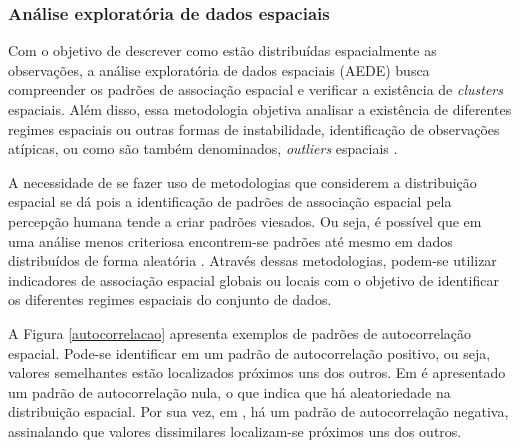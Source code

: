 \documentclass[
	12pt,				%
	openright,			%
	oneside,			%
	a4paper,			%
	chapter=TITLE,		%
	section=TITLE,		%
	english,			%
	french,				%
	spanish,			%
	brazil				%
	]{abntex2}
\begin{document}
 


\subsubsection{Análise exploratória de dados espaciais}


Com o objetivo de descrever como estão distribuídas espacialmente as observações, a análise exploratória de dados espaciais (AEDE) busca compreender os padrões de associação espacial e verificar a existência de \textit{clusters} espaciais. Além disso, essa metodologia  objetiva analisar a existência de diferentes regimes espaciais  ou outras formas de instabilidade, identificação de observações atípicas, ou como são também denominados, \textit{outliers} espaciais \cite{almeida12}.

A necessidade de se fazer uso de metodologias que considerem a distribuição espacial se dá pois a identificação de padrões de associação espacial pela percepção humana tende a criar padrões viesados. Ou seja, é possível que em uma análise menos criteriosa encontrem-se padrões até mesmo em dados distribuídos de forma aleatória \cite{messner99}. Através dessas metodologias, podem-se utilizar indicadores de associação espacial globais ou locais com o objetivo de identificar os diferentes regimes espaciais do conjunto de dados.

A Figura \ref{autocorrelacao} apresenta exemplos de padrões de autocorrelação espacial. Pode-se identificar em   um padrão de autocorrelação positivo, ou seja, valores semelhantes estão localizados próximos uns dos outros. Em   é apresentado um padrão de autocorrelação nula, o que indica que há aleatoriedade na distribuição espacial. Por sua vez, em , há um padrão de autocorrelação negativa, assinalando que valores dissimilares localizam-se próximos uns dos outros. 
\end{document}
